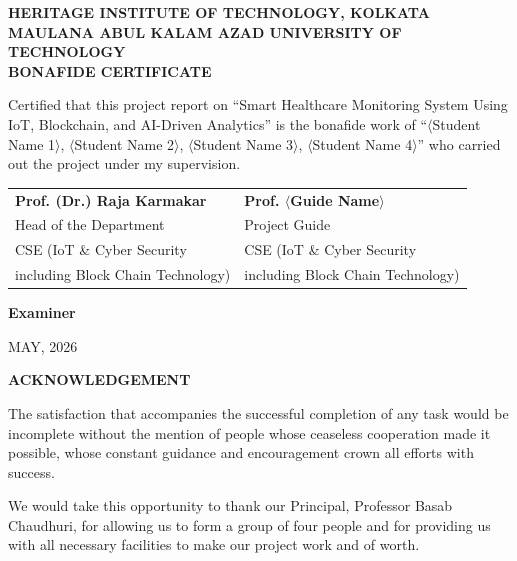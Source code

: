 \documentclass[12pt,a4paper]{report}
\begin{document}
\newpage
\thispagestyle{empty}
\begin{center}
{\Large\bfseries HERITAGE INSTITUTE OF TECHNOLOGY, KOLKATA\\[0.5cm]}
{\large\bfseries MAULANA ABUL KALAM AZAD UNIVERSITY OF TECHNOLOGY\\[3cm]}
{\LARGE\bfseries BONAFIDE CERTIFICATE\\[1.5cm]}
\end{center}

\noindent
Certified that this project report on ``Smart Healthcare Monitoring System Using IoT, Blockchain, and AI-Driven Analytics'' is the bonafide work of ``$\langle$Student Name 1$\rangle$, $\langle$Student Name 2$\rangle$, $\langle$Student Name 3$\rangle$, $\langle$Student Name 4$\rangle$'' who carried out the project under my supervision.

\vspace{5cm}

\noindent
\begin{tabular}{@{}p{}p{}@{}}
\textbf{Prof. (Dr.) Raja Karmakar} & \textbf{Prof. $\langle$Guide Name$\rangle$} \\
Head of the Department & Project Guide \\
CSE (IoT \& Cyber Security & CSE (IoT \& Cyber Security \\
including Block Chain Technology) & including Block Chain Technology) \\
\end{tabular}

\vspace{4cm}
\noindent\textbf{Examiner}

\vspace{1cm}
\begin{center}
MAY, 2026
\end{center}


\newpage
\thispagestyle{empty}
\begin{center}
{\LARGE\bfseries ACKNOWLEDGEMENT\\[1cm]}
\end{center}

The satisfaction that accompanies the successful completion of any task would be incomplete without the mention of people whose ceaseless cooperation made it possible, whose constant guidance and encouragement crown all efforts with success.

\vspace{0.5cm}
We would take this opportunity to thank our Principal, Professor Basab Chaudhuri, for allowing us to form a group of four people and for providing us with all necessary facilities to make our project work and of worth.
\end{document}
